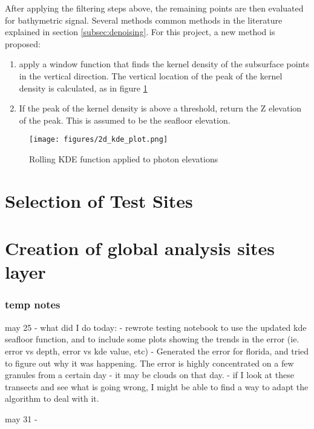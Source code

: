 After applying the filtering steps above, the remaining points are then evaluated for bathymetric signal. Several methods common methods in the literature explained in section \ref{subsec:denoising}. For this project, a new method is proposed:


\begin{enumerate}
    \item apply a window function that finds the kernel density of the subsurface points in the vertical direction. The vertical location of the peak of the kernel density is calculated, as in figure \ref{fig:kdefunc}
    \item If the peak of the kernel density is above a threshold, return the Z elevation of the peak. This is assumed to be the seafloor elevation.
\end{enumerate}

\begin{figure}[htbp]
    \centering
    \texttt{[image: figures/2d\_kde\_plot.png]}
    \caption{Rolling KDE function applied to photon elevations}
    \label{fig:kdefunc}
\end{figure}

\section{Selection of Test Sites}
\section{Creation of global analysis sites layer}
\subsubsection*{temp notes}

may 25 - what did I do today:
- rewrote testing notebook to use the updated kde seafloor function, and to include some plots showing the trends in the error (ie. error vs depth, error vs kde value, etc)
- Generated the error for florida, and tried to figure out why it was happening. The error is highly concentrated on a few granules from a certain day - it may be clouds on that day.
- if I look at these transects and see what is going wrong, I might be able to find a way to adapt the algorithm to deal with it.

may 31 -

